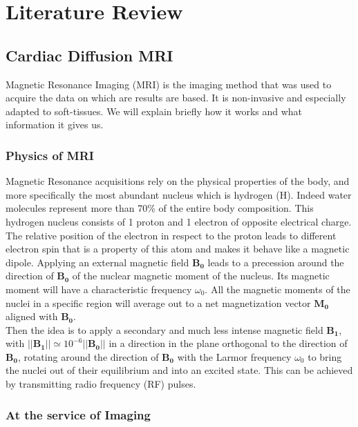 \chapter{Literature Review}

\section{Cardiac Diffusion MRI}

Magnetic Resonance Imaging (MRI) is the imaging method that was used to acquire the data on which are results are based. It is non-invasive and especially adapted to soft-tissues. \cite{bakermans2008} We will explain briefly how it works and what information it gives us.

\subsection{Physics of MRI}

Magnetic Resonance acquisitions rely on the physical properties of the body, and more specifically the most abundant nucleus which is hydrogen (H). Indeed water molecules represent more than 70\% of the entire body composition. This hydrogen nucleus consists of 1 proton and 1 electron of opposite electrical charge. The relative position of the electron in respect to the proton leads to different electron spin that is a property of this atom and makes it behave like a magnetic dipole. Applying an external magnetic field $\mathbf{B_0}$ leads to a precession around the direction of $\mathbf{B_0}$ of the nuclear magnetic moment of the nucleus. Its magnetic moment will have a characteristic frequency $\omega_0$. All the magnetic moments of the nuclei in a specific region will average out to a net magnetization vector $\mathbf{M_0}$ aligned with $\mathbf{B_0}$.\\
Then the idea is to apply a secondary and much less intense magnetic field $\mathbf{B_1}$, with $||\mathbf{B_1}|| \simeq 10^{-6}||\mathbf{B_0}||$ in a direction in the plane orthogonal to the direction of $\mathbf{B_0}$, rotating around the direction of $\mathbf{B_0}$ with the Larmor frequency $\omega_0$ to bring the nuclei out of their equilibrium and into an excited state. This can be achieved by transmitting radio frequency (RF) pulses.\\

\subsection{At the service of Imaging}

